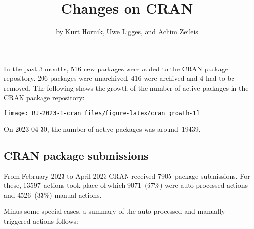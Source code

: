 \title{Changes on CRAN}


\author{by Kurt Hornik, Uwe Ligges, and Achim Zeileis}

\maketitle


In the past 3 months, 516 new packages were
added to the CRAN package repository. 206
packages were unarchived, 416 were archived and
4 had to be removed. The following shows the
growth of the number of active packages in the CRAN package repository:

\begin{center}\texttt{[image: RJ-2023-1-cran\_files/figure-latex/cran\_growth-1]} \end{center}

\noindent On 2023-04-30, the number of active packages was around~19439.

\subsection{CRAN package submissions}\label{cran-package-submissions}

From February 2023 to April 2023
CRAN received 7905~package submissions.
For these, 13597~actions took place of which
9071~(67\%) were auto processed actions and
4526~(33\%) manual actions.

Minus some special cases, a summary of the auto-processed and manually
triggered actions follows:

